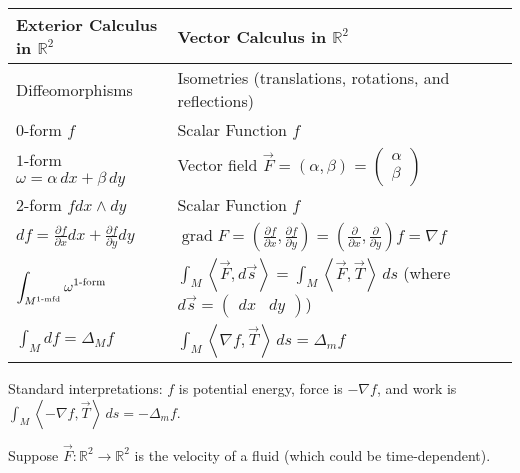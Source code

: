 \documentclass[10pt,letterpaper]{article}
\newcommand{\n}{\hfill\break}
\newcommand{\ptxt}[1]{\textrm{\textnormal{#1}}}
\newcommand{\reals}{\mathbb{R}}
\newcommand{\R}{\reals}
\newcommand{\iprod}[1]{\left<#1\right>}
\newcommand{\paren}[1]{\left(#1\right)}
\begin{document}
\begin{center}
\begin{tabular}{l|l}
Exterior Calculus in $\R^{2}$ & Vector Calculus in $\R^{2}$\\ \hline
Diffeomorphisms & Isometries (translations, rotations, and reflections)\\
$0$-form $f$ & Scalar Function $f$\\
$1$-form $\omega=\alpha\,dx+\beta\,dy$ & Vector field $\vec{F}=(\alpha,\beta)=\paren{\begin{array}{c}\alpha\\ \beta\end{array}}$\\
$2$-form $fdx\wedge{}dy$ & Scalar Function $f$\\
$\displaystyle{}df=\frac{\partial{}f}{\partial{}x}dx+\frac{\partial{}f}{\partial{}y}dy$ & $\displaystyle\operatorname{grad}F=\paren{\frac{\partial{}f}{\partial{}x},\frac{\partial{}f}{\partial{}y}}=\paren{\frac{\partial}{\partial{}x},\frac{\partial}{\partial{}y}}f=\nabla{}f$\\
$\displaystyle\int_{M^{1\ptxt{-mfd}}}\omega^{1\ptxt{-form}}$ & $\displaystyle\int_{M}\iprod{\vec{F},d\vec{s}}=\int_{M}\iprod{\vec{F},\vec{T}}\,ds$ (where $d\vec{s}=\paren{\begin{array}{cc}dx & dy\end{array}}$)\\
$\displaystyle\int_{M}df=\Delta_{M}f$ & $\displaystyle\int_{M}\iprod{\nabla{}f,\vec{T}}\,ds=\Delta_{m}f$
\end{tabular}
\end{center}

\par\noindent Standard interpretations: $f$ is potential energy, force is $-\nabla{}f$, and work is $\int_{M}\iprod{-\nabla{}f,\vec{T}}\,ds=-\Delta_{m}f$.\n

\par\noindent Suppose $\vec{F}:\R^{2}\to\R^{2}$ is the velocity of a fluid (which could be time-dependent).
\end{document}
